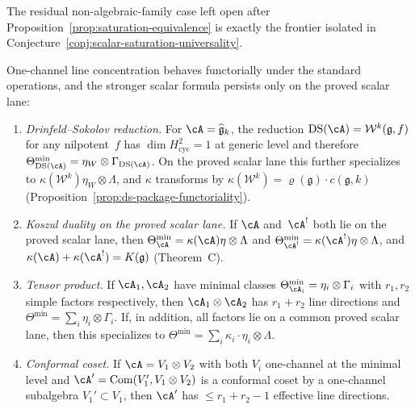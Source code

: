 \begin{remark}
\label{rem:saturation-equivalence-frontier}
The residual non-algebraic-family case left open after
Proposition~\ref{prop:saturation-equivalence} is exactly the
frontier isolated in
Conjecture~\ref{conj:scalar-saturation-universality}.
\end{remark}

\begin{proposition}
\label{prop:saturation-functorial}
One-channel line concentration behaves functorially under the standard
operations, and the stronger scalar formula persists only on the
proved scalar lane:
\begin{enumerate}[label=\textup{(\alph*)}]
\item \emph{Drinfeld--Sokolov reduction.}
  For\/ $\cA = \widehat{\mathfrak{g}}_k$, the reduction
  $\mathrm{DS}(\cA) = \mathcal{W}^k(\mathfrak{g},f)$ for any
  nilpotent~$f$ has
  $\dim H^2_{\mathrm{cyc}} = 1$ at generic level and therefore
  $\Theta_{\mathrm{DS}(\cA)}^{\min}
   = \eta_W \otimes \Gamma_{\mathrm{DS}(\cA)}$.
  On the proved scalar lane this further specializes to
  $\kappa(\mathcal{W}^k)\eta_W\otimes\Lambda$, and $\kappa$
  transforms by
  $\kappa(\mathcal{W}^k) = \varrho(\mathfrak{g})\cdot c(\mathfrak{g},k)$
  \textup{(}Proposition~\textup{\ref{prop:ds-package-functoriality}}\textup{)}.
\item \emph{Koszul duality on the proved scalar lane.}
  If\/ $\cA$ and\/~$\cA^!$ both lie on the proved scalar lane, then
  $\Theta_{\cA}^{\min} = \kappa(\cA)\eta\otimes\Lambda$ and
  $\Theta_{\cA^!}^{\min} = \kappa(\cA^!)\eta\otimes\Lambda$, and
  $\kappa(\cA) + \kappa(\cA^!) = K(\mathfrak{g})$
  \textup{(}Theorem~\textup{C}\textup{)}.
\item \emph{Tensor product.}
  If\/ $\cA_1, \cA_2$ have minimal classes
  $\Theta_{\cA_i}^{\min} = \eta_i \otimes \Gamma_i$
  with $r_1, r_2$ simple factors respectively, then
  $\cA_1 \otimes \cA_2$ has $r_1 + r_2$
  line directions and
  $\Theta^{\min} = \sum_i \eta_i \otimes \Gamma_i$.
  If, in addition, all factors lie on a common proved scalar lane,
  then this specializes to
  $\Theta^{\min} = \sum_i \kappa_i \cdot \eta_i \otimes \Lambda$.
\item \emph{Conformal coset.}
  If\/ $\cA = V_1 \otimes V_2$ with both $V_i$
  one-channel at the minimal level and
  $\cA' = \mathrm{Com}(V_1', V_1 \otimes V_2)$ is
  a conformal coset by a one-channel subalgebra
  $V_1' \subset V_1$, then $\cA'$ has $\leq r_1 + r_2 - 1$
  effective line directions.
\end{enumerate}
\end{proposition}

